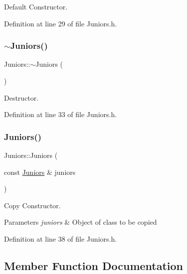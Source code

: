 Default Constructor. 



Definition at line 29 of file Juniors.\+h.

\hypertarget{class_juniors_ae9087dae0157d9a4539f5fc7e68e7478}{}\label{class_juniors_ae9087dae0157d9a4539f5fc7e68e7478} 
\subsubsection{\texorpdfstring{$\sim$\+Juniors()}{~Juniors()}}
{\footnotesize\ttfamily Juniors\+::$\sim$\+Juniors (\begin{DoxyParamCaption}{ }\end{DoxyParamCaption})\hspace{0.3cm}{\ttfamily [inline]}}



Destructor. 



Definition at line 33 of file Juniors.\+h.

\hypertarget{class_juniors_ab9b00b26e59661ee5aee18a3a6beb53c}{}\label{class_juniors_ab9b00b26e59661ee5aee18a3a6beb53c} 
\subsubsection{\texorpdfstring{Juniors()}{Juniors()}\hspace{0.1cm}{\footnotesize\ttfamily [2/2]}}
{\footnotesize\ttfamily Juniors\+::\+Juniors (\begin{DoxyParamCaption}\item[{const \hyperlink{class_juniors}{Juniors} \&}]{juniors }\end{DoxyParamCaption})\hspace{0.3cm}{\ttfamily [inline]}}



Copy Constructor. 


\begin{DoxyParams}{Parameters}
{\em juniors} & Object of class to be copied \\
\hline
\end{DoxyParams}


Definition at line 38 of file Juniors.\+h.



\subsection{Member Function Documentation}
\hypertarget{class_juniors_a23915dab5b0c30a978f08a653483db53}{}\label{class_juniors_a23915dab5b0c30a978f08a653483db53} 
